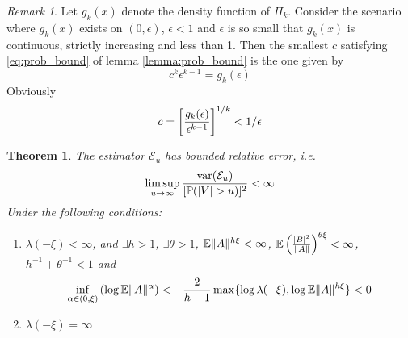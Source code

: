 \documentclass{article}
\newtheorem{theorem}{Theorem}
\theoremstyle{remark}
\newtheorem{remark}{Remark}
\begin{document}
\begin{remark}\label{remark:inf_c}
  Let $g_k(x)$ denote the density function of $\Pi_k$. Consider the
  scenario where $g_k(x)$ exists on $(0, \epsilon)$, $\epsilon < 1$
  and $\epsilon$ is so small that $g_k(x)$ is continuous, strictly
  increasing and less than 1. Then the smallest $c$ satisfying
  \eqref{eq:prob_bound} of lemma \ref{lemma:prob_bound} is the one
  given by
  \[
  c^k \epsilon^{k-1} = g_k(\epsilon)
  \]
  Obviously
  \[
  c = \left[
    {g_k(\epsilon) \over \epsilon^{k-1}}
  \right]^{1/k} < 1/\epsilon
  \]
\end{remark}

\begin{theorem}
  The estimator $\mathcal E_u$ has bounded relative error, i.e.
  \begin{equation*}
    \limsup_{u \to \infty} {\text{var}(\mathcal E_u) \over [\mathbb{P}(|V| > u)]^2} < \infty
  \end{equation*}
  Under the following conditions:
  \begin{enumerate}
  \item $\lambda(-\xi) < \infty$, and $\exists h > 1$,
    $\exists \theta > 1$, $\mathbb{E}\|A\|^{h\xi} < \infty$,
    $\mathbb{E}\left({|B|^2 \over \|A\|}\right)^{\theta\xi} < \infty$,
    $h^{-1} + \theta^{-1} < 1$ and
    \begin{equation}
      \label{eq:deepness}
      \inf_{\alpha \in (0, \xi)} \left(\log \mathbb{E}\|A\|^{\alpha}\right)
      < -{2 \over h-1} \max\{\log \lambda(-\xi), \log\mathbb{E}\|A\|^{h \xi}\}
      < 0
    \end{equation}
  \item $\lambda(-\xi) = \infty$
  \end{enumerate}
\end{theorem}
\end{document}
